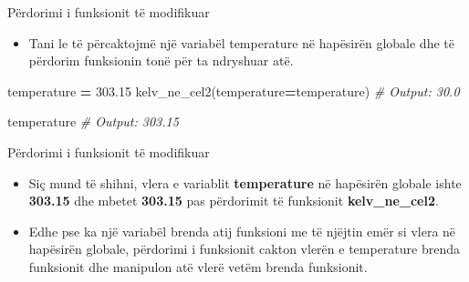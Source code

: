 \documentclass[
  ignorenonframetext,
]{beamer}
\newenvironment{Shaded}{\begin{snugshade}}{\end{snugshade}}
\newcommand{\CommentTok}[1]{\textcolor[rgb]{0.56,0.35,0.01}{\textit{#1}}}
\newcommand{\FloatTok}[1]{\textcolor[rgb]{0.00,0.00,0.81}{#1}}
\newcommand{\NormalTok}[1]{#1}
\newcommand{\OperatorTok}[1]{\textcolor[rgb]{0.81,0.36,0.00}{\textbf{#1}}}
\providecommand{\tightlist}{%
  \setlength{\itemsep}{0pt}\setlength{\parskip}{0pt}}
\begin{document}
\begin{frame}[fragile]{Përdorimi i funksionit të modifikuar}
\protect\hypertarget{puxebrdorimi-i-funksionit-tuxeb-modifikuar}{}
\begin{itemize}
\tightlist
\item
  Tani le të përcaktojmë një variabël temperature në hapësirën globale
  dhe të përdorim funksionin tonë për ta ndryshuar atë.
\end{itemize}

\begin{Shaded}
\begin{Highlighting}[]
\NormalTok{temperature }\OperatorTok{=} \FloatTok{303.15}
\NormalTok{kelv\_ne\_cel2(temperature}\OperatorTok{=}\NormalTok{temperature)}
\CommentTok{\# Output: 30.0}

\NormalTok{temperature}
\CommentTok{\# Output: 303.15}
\end{Highlighting}
\end{Shaded}
\end{frame}

\begin{frame}{Përdorimi i funksionit të modifikuar}
\protect\hypertarget{puxebrdorimi-i-funksionit-tuxeb-modifikuar-1}{}
\begin{itemize}
\item
  Siç mund të shihni, vlera e variablit \textbf{temperature} në
  hapësirën globale ishte \textbf{303.15} dhe mbetet \textbf{303.15} pas
  përdorimit të funksionit \textbf{kelv\_ne\_cel2}.
\item
  Edhe pse ka një variabël brenda atij funksioni me të njëjtin emër si
  vlera në hapësirën globale, përdorimi i funksionit cakton vlerën e
  temperature brenda funksionit dhe manipulon atë vlerë vetëm brenda
  funksionit.
\end{itemize}
\end{frame}
\end{document}
